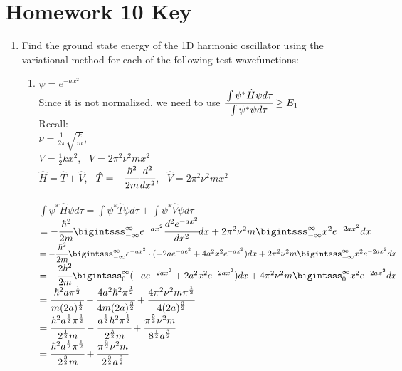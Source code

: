 \documentclass[a4paper,12pt]{article}
\begin{document}
\section*{Homework 10 Key}
\begin{enumerate}%
\item Find the ground state energy of the 1D harmonic oscillator using the variational method
for each of the following test wavefunctions:
    \begin{enumerate}
        \item $\psi=e^{-ax^2}$
        \\ Since it is not normalized, we need to use $\cfrac{\int\psi^*\hat{H}\psi d\tau}{\int\psi^*\psi d\tau}\ge E_1$
        \\ Recall:
        \\ $\nu=\frac{1}{2\pi}\sqrt{\frac{k}{m}}$,
        \\ $V=\frac{1}{2}kx^2$, 
        \ $V=2\pi^2\nu^2mx^2$
        \\ $\hat{H}=\hat{T}+\hat{V}$,
        \ $\hat{T}=-\cfrac{\hbar^2}{2m}\cfrac{d^2}{dx^2}$,
        \ $\hat{V}=2\pi^2\nu^2mx^2$
        \\
        \\ $\int\psi^*\hat{H}\psi d\tau=\int\psi^*\hat{T}\psi d\tau+\int\psi^*\hat{V}\psi d\tau$
        \\ $=-\cfrac{\hbar^2}{2m}\bigintsss_{-\infty}^\infty e^{-ax^2}\cfrac{d^2e^{-ax^2}}{dx^2}dx +2\pi^2 \nu^2m\bigintsss_{-\infty}^\infty x^2e^{-2ax^2}dx$
        \\ $=-\cfrac{\hbar^2}{2m}\bigintsss_{-\infty}^\infty e^{-ax^2}\cdot (-2ae^{-ae^2}+4a^2x^2e^{-ax^2})dx +2\pi^2 \nu^2m\bigintsss_{-\infty}^\infty x^2e^{-2ax^2}dx$
        \\ $=-\cfrac{2\hbar^2}{2m}\bigintsss_{0}^\infty (-ae^{-2ax^2}+2a^2x^2e^{-2ax^2})dx +4\pi ^2 \nu^2m\bigintsss_{0}^\infty x^2e^{-2ax^2}dx$
        \\ $=\cfrac{\hbar^2a\pi^\frac{1}{2}}{m(2a)^\frac{1}{2}}-\cfrac{4a^2\hbar^2\pi^\frac{1}{2}}{4m(2a)^\frac{3}{2}}+\cfrac{4\pi^2\nu^2m\pi^\frac{1}{2}}{4
        (2a)^\frac{3}{2}}$
        \\ $=\cfrac{\hbar^2a^\frac{1}{2}\pi^\frac{1}{2}}{2^\frac{1}{2}m}-\cfrac{a^\frac{1}{2}\hbar^2\pi^\frac{1}{2}}{2^\frac{3}{2}m}+\cfrac{\pi^\frac{5}{2}\nu^2m}{8^\frac{1}{2}a^\frac{3}{2}}$
        \\ $=\cfrac{\hbar^2a^\frac{1}{2}\pi^\frac{1}{2}}{2^\frac{3}{2}m}+\cfrac{\pi^\frac{5}{2}\nu^2m}{2^\frac{3}{2}a^\frac{3}{2}}$
        \\

\end{enumerate}
\end{enumerate}
\end{document}
